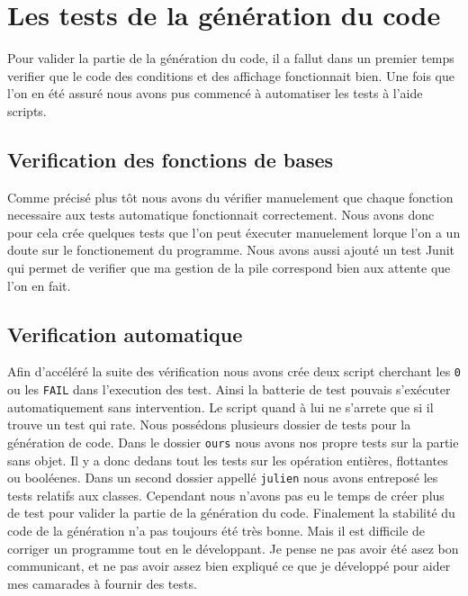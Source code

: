 \documentclass{article}
\begin{document}
\section{Les tests de la génération du code}
Pour valider la partie de la génération du code, il a fallut dans un premier temps verifier que le code des conditions et des affichage fonctionnait bien. Une fois que l'on en été assuré nous avons pus commencé à automatiser les tests à l'aide scripts.
\subsection{Verification des fonctions de bases}
Comme précisé plus tôt nous avons du vérifier manuelement que chaque fonction necessaire aux tests automatique fonctionnait correctement. Nous avons donc pour cela crée quelques tests que l'on peut éxecuter manuelement lorque l'on a un doute sur le fonctionement du programme. Nous avons aussi ajouté un test Junit qui permet de verifier que ma gestion de la pile correspond bien aux attente que l'on en fait. 
\subsection{Verification automatique} 
Afin d'accéléré la suite des vérification nous avons crée deux script cherchant les \texttt{0} ou les \texttt{FAIL} dans l'execution des test. Ainsi la batterie de test pouvais s'exécuter automatiquement sans intervention. Le script quand à lui ne s'arrete que si il trouve un test qui rate. Nous possédons plusieurs dossier de tests pour la génération de code. Dans le dossier \texttt{ours} nous avons nos propre tests sur la partie sans objet. Il y a donc dedans tout les tests sur les opération entières, flottantes ou booléenes. Dans un second dossier appellé \texttt{julien} nous avons entreposé les tests relatifs aux classes. Cependant nous n'avons pas eu le temps de créer plus de test pour valider la partie de la génération du code. 
\newline
Finalement la stabilité du code de la génération n'a pas toujours été très bonne. Mais il est difficile de corriger un programme tout en le développant. Je pense ne pas avoir été asez bon communicant, et ne pas avoir assez bien expliqué ce que je développé pour aider mes camarades à fournir des tests.
\end{document}
